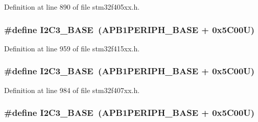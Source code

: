 Definition at line 890 of file stm32f405xx.\+h.

\subsubsection[{\texorpdfstring{I2\+C3\+\_\+\+B\+A\+SE}{I2C3_BASE}}]{\setlength{\rightskip}{0pt plus 5cm}\#define I2\+C3\+\_\+\+B\+A\+SE~({\bf A\+P\+B1\+P\+E\+R\+I\+P\+H\+\_\+\+B\+A\+SE} + 0x5\+C00\+U)}\hypertarget{group___peripheral__registers__structures_ga4e8b9198748235a1729e1e8f8f24983b}{}\label{group___peripheral__registers__structures_ga4e8b9198748235a1729e1e8f8f24983b}


Definition at line 959 of file stm32f415xx.\+h.

\subsubsection[{\texorpdfstring{I2\+C3\+\_\+\+B\+A\+SE}{I2C3_BASE}}]{\setlength{\rightskip}{0pt plus 5cm}\#define I2\+C3\+\_\+\+B\+A\+SE~({\bf A\+P\+B1\+P\+E\+R\+I\+P\+H\+\_\+\+B\+A\+SE} + 0x5\+C00\+U)}\hypertarget{group___peripheral__registers__structures_ga4e8b9198748235a1729e1e8f8f24983b}{}\label{group___peripheral__registers__structures_ga4e8b9198748235a1729e1e8f8f24983b}


Definition at line 984 of file stm32f407xx.\+h.

\subsubsection[{\texorpdfstring{I2\+C3\+\_\+\+B\+A\+SE}{I2C3_BASE}}]{\setlength{\rightskip}{0pt plus 5cm}\#define I2\+C3\+\_\+\+B\+A\+SE~({\bf A\+P\+B1\+P\+E\+R\+I\+P\+H\+\_\+\+B\+A\+SE} + 0x5\+C00\+U)}\hypertarget{group___peripheral__registers__structures_ga4e8b9198748235a1729e1e8f8f24983b}{}\label{group___peripheral__registers__structures_ga4e8b9198748235a1729e1e8f8f24983b}


